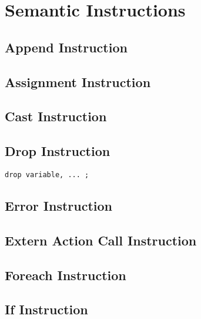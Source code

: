 
\chapter{Semantic Instructions}



\section{Append Instruction}


\section{Assignment Instruction}


\section{Cast Instruction}



\section{Drop Instruction}

{
\begin{lstlisting}[language=galgas]
drop variable, ... ;
\end{lstlisting}
}

\section{Error Instruction}


\section{Extern Action Call Instruction}




\section{Foreach Instruction}


\section{If Instruction}


